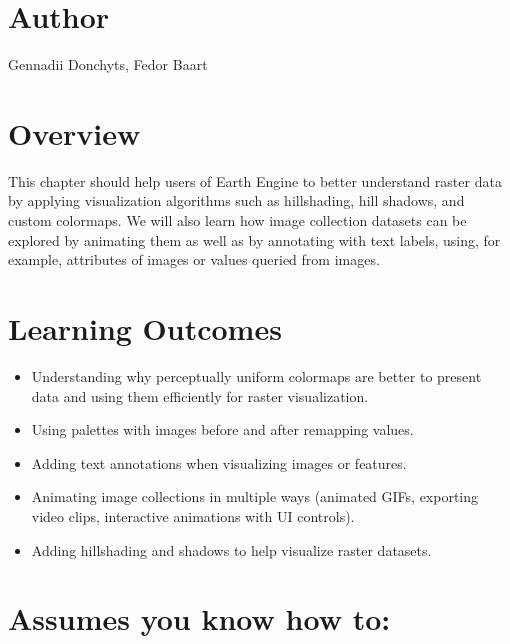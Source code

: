 \documentclass[
  letterpaper,
  DIV=11,
  numbers=noendperiod]{scrreprt}
\providecommand{\tightlist}{%
  \setlength{\itemsep}{0pt}\setlength{\parskip}{0pt}}\usepackage{longtable,booktabs,array}
\begin{document}
\hypertarget{author-19}{%
\section*{Author}\label{author-19}}


Gennadii Donchyts, Fedor Baart

\hypertarget{overview-20}{%
\section*{Overview}\label{overview-20}}


This chapter should help users of Earth Engine to better understand
raster data by applying visualization algorithms such as hillshading,
hill shadows, and custom colormaps. We will also learn how image
collection datasets can be explored by animating them as well as by
annotating with text labels, using, for example, attributes of images or
values queried from images.

\hypertarget{learning-outcomes-20}{%
\section*{Learning Outcomes}\label{learning-outcomes-20}}


\begin{itemize}
\tightlist
\item
  Understanding why perceptually uniform colormaps are better to present
  data and using them efficiently for raster visualization.
\item
  Using palettes with images before and after remapping values.
\item
  Adding text annotations when visualizing images or features.
\item
  Animating image collections in multiple ways (animated GIFs, exporting
  video clips, interactive animations with UI controls).
\item
  Adding hillshading and shadows to help visualize raster datasets.
\end{itemize}

\hypertarget{assumes-you-know-how-to-20}{%
\section*{Assumes you know how to:}\label{assumes-you-know-how-to-20}}
\end{document}
